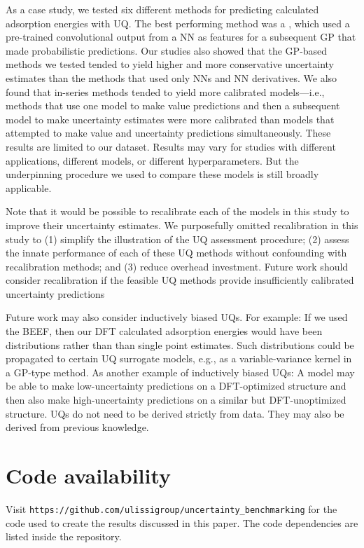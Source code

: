 \documentclass[]{achemso}
\begin{document}
As a case study, we tested six different methods for predicting  calculated adsorption energies with \gls{UQ}.
The best performing method was a , which used a pre-trained convolutional output from a \gls{NN} as features for a subsequent \gls{GP} that made probabilistic predictions.
Our studies also showed that the \gls{GP}-based methods we tested tended to yield higher and more conservative uncertainty estimates than the methods that used only \gls{NN}s and \gls{NN} derivatives.
We also found that in-series methods tended to yield more calibrated models---i.e., methods that use one model to make value predictions and then a subsequent model to make uncertainty estimates were more calibrated than models that attempted to make value and uncertainty predictions simultaneously.
These results are limited to our dataset.
Results may vary for studies with different applications, different models, or different hyperparameters.
But the underpinning procedure we used to compare these models is still broadly applicable.

Note that it would be possible to recalibrate\cite{Kuleshov2018} each of the models in this study to improve their uncertainty estimates.
We purposefully omitted recalibration in this study to (1) simplify the illustration of the \gls{UQ} assessment procedure; (2) assess the innate performance of each of these \gls{UQ} methods without confounding with recalibration methods; and (3) reduce overhead investment.
Future work should consider recalibration if the feasible \gls{UQ} methods provide insufficiently calibrated uncertainty predictions

Future work may also consider inductively biased \gls{UQ}s.
For example:  If we used the \gls{BEEF},\cite{Wellendorff2012} then our \gls{DFT} calculated adsorption energies would have been distributions rather than than single point estimates.
Such distributions could be propagated to certain \gls{UQ} surrogate models, e.g., as a variable-variance kernel in a \gls{GP}-type method.
As another example of inductively biased \gls{UQ}s:  A model may be able to make low-uncertainty predictions on a \gls{DFT}-optimized structure and then also make high-uncertainty predictions on a similar but \gls{DFT}-unoptimized structure.
\gls{UQ}s do not need to be derived strictly from data.
They may also be derived from previous knowledge.



\section*{Code availability} Visit \texttt{https://github.com/ulissigroup/uncertainty\_benchmarking} for the code used to create the results discussed in this paper.
The code dependencies are listed inside the repository.
\end{document}
